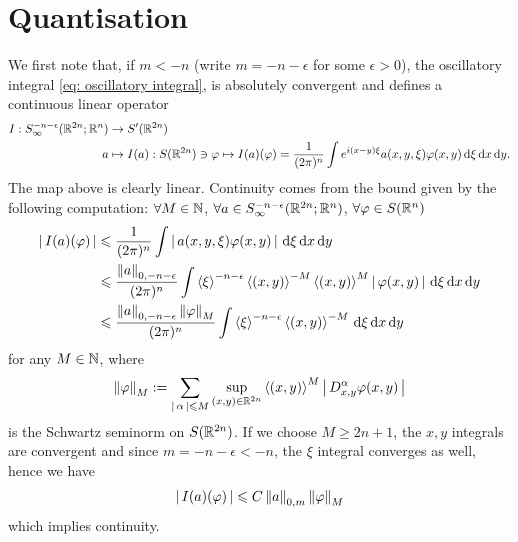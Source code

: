 \documentclass{article}
\begin{document}
\section{Quantisation}
We first note that, if $m < -n$ (write $m = -n - \epsilon$ for some $\epsilon > 0$), the oscillatory integral \ref{eq: oscillatory integral}, is absolutely convergent and defines a continuous linear operator 
\begin{align*}
I: S^{-n -\epsilon}_\infty(\R^{2n}; \R^n) &\to S'(\R^{2n}) \\
 a & \mapsto I(a) : S(\R^{2n}) \ni \varphi \mapsto I(a)(\varphi) = \frac{1}{(2\pi)^n} \int e^{i(x- y)\xi} a(x, y, \xi) \varphi(x, y) \d[\xi] \d[x] \d[y]. 
\end{align*} 
The map above is clearly linear. Continuity comes from the bound given by the following computation: $\forall M \in \N$, $\forall a \in S^{-n -\epsilon}_\infty(\R^{2n}; \R^n)$, $\forall \varphi \in S(\R^n)$ 
\begin{align*}
\abs{I(a)(\varphi)}
& \leq \frac{1}{(2\pi)^n} \int \abs{a(x, y, \xi) \varphi(x, y)} \d[\xi] \d[x] \d[y]\\
& \leq \frac{\norm[a]_{0, -n -\epsilon}}{(2\pi)^n} \int \sym[\xi]^{-n -\epsilon} \sym[(x, y)]^{-M} \sym[(x, y)]^{M} \abs{\varphi(x, y)} \d[\xi] \d[x] \d[y]\\
& \leq \frac{\norm[a]_{0, -n -\epsilon} \norm[\varphi]_M}{(2\pi)^n} \int \sym[\xi]^{-n -\epsilon} \sym[(x, y)]^{-M}  \d[\xi] \d[x] \d[y]\\
\end{align*}
for any $M \in \N$, where 
\begin{align} \label{eq: Schwartz seminorm} 
\norm[\varphi]_M :=  \sum_{\abs{\alpha} \leq M}  \sup_{(x, y) \in \R^{2n}} \sym[(x, y)]^M \abs{D^{\alpha}_{x, y} \varphi(x, y)}
\end{align}
is the Schwartz  seminorm on $S(\R^{2n})$. If we choose $M \geq 2n +1$, the $x, y$ integrals are convergent and since $m = -n -\epsilon < -n$, the $\xi$ integral converges as well, hence we have 
\begin{align*}
\abs{I(a)(\varphi)} \leq C \norm[a]_{0, m} \norm[\varphi]_M
\end{align*}
which implies continuity. \\
\end{document}

